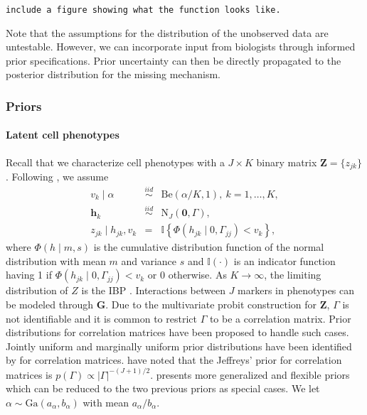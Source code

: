 \documentclass[12pt,]{article}
\newcommand{\abs}[1]{ \left|#1\right| }
\newcommand{\N}{ \mathcal{N} }
\newcommand{\iid}{\overset{iid}{\sim}}
\def\N{\text{N}}
\def\G{\text{Ga}}
\def\Be{\text{Be}}
\def\h{\bm{h}}
\def\Z{\bm{Z}}
\begin{document}
{\tt include a figure showing what the function looks like. }

Note that the assumptions for the distribution of the unobserved data are
untestable. However, we can incorporate input from biologists through informed
prior specifications. Prior uncertainty can then be directly propagated to the
posterior distribution for the missing mechanism.


\subsubsection{Priors}\label{priors}
\paragraph*{Latent cell phenotypes}  Recall that we characterize cell phenotypes with a $J\times K$ binary matrix \(\Z =\{z_{jk}\}\).  Following \citet{williamson2010dependent}, we assume
\begin{eqnarray*}
v_k \mid \alpha &\iid& \Be(\alpha/K, 1),~ k=1, \ldots, K, \\
\h_k &\iid& \N_J(\bm{0}, \Gamma), \\ 
z_{jk} \mid h_{jk}, v_k &=& \mathbb{I}\left\{ \Phi(h_{jk} \mid 0, \Gamma_{jj}) < v_k \right\},
\end{eqnarray*}
where $\Phi(h \mid m, s)$ is the cumulative distribution function of the normal
distribution with mean $m$ and variance $s$ and $\mathbb{I}(\cdot)$ is an
indicator function having 1 if $\Phi(h_{jk} \mid 0, \Gamma_{jj}) < v_k$ or 0
otherwise.  As $K \rightarrow \infty$, the limiting distribution of $Z$ is the
IBP \citep{griffiths2011indian}.  Interactions between $J$ markers in
phenotypes can be modeled through $\bm G$.  Due to the multivariate probit
construction for $\Z$, $\Gamma$ is not identifiable and it is common to
restrict $\Gamma$ to be a correlation matrix. Prior distributions for
correlation matrices have been proposed to handle such cases. Jointly uniform
and marginally uniform prior distributions have been identified by
\cite{barnard2000modeling} for correlation matrices. \cite{box2011bayesian}
have noted that the Jeffreys' prior for correlation matrices is $p(\Gamma)
\propto \abs{\Gamma}^{-(J+1)/2}$.  \cite{zhang2006sampling} presents more
generalized and flexible priors which can be reduced to the two previous priors
as special cases.
%
%
We let $\alpha \sim \G(a_\alpha, b_\alpha)$ with mean $a_\alpha/b_\alpha$.  
\end{document}

